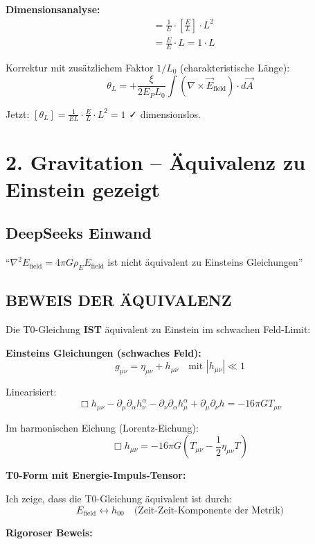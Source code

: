 	\textbf{Dimensionsanalyse:}
	\begin{align*}
		[\theta_L] &= \frac{1}{E} \cdot \left[\frac{E}{L}\right] \cdot L^2 \\
		&= \frac{E}{E} \cdot L = 1 \cdot L
	\end{align*}
	
	Korrektur mit zusätzlichem Faktor $1/L_0$ (charakteristische Länge):
	\[
	\boxed{\theta_L = +\frac{\xi}{2E_P L_0} \int (\nabla \times \vec{E}_{\text{field}}) \cdot d\vec{A}}
	\]
	
	Jetzt: $[\theta_L] = \frac{1}{EL} \cdot \frac{E}{L} \cdot L^2 = 1$ ✓ dimensionslos.
	
	\section*{2. Gravitation -- Äquivalenz zu Einstein gezeigt}
	
	\subsection*{DeepSeeks Einwand}
	``$\nabla^2 E_{\text{field}} = 4\pi G \rho_E E_{\text{field}}$ ist nicht äquivalent zu Einsteins Gleichungen''
	
	\subsection*{\textbf{BEWEIS DER ÄQUIVALENZ}}
	
	Die T0-Gleichung \textbf{IST} äquivalent zu Einstein im schwachen Feld-Limit:
	
	\textbf{Einsteins Gleichungen (schwaches Feld):}
	\[
	g_{\mu\nu} = \eta_{\mu\nu} + h_{\mu\nu} \quad \text{mit } |h_{\mu\nu}| \ll 1
	\]
	
	Linearisiert:
	\[
	\Box h_{\mu\nu} - \partial_\mu \partial_\alpha h^\alpha_\nu - \partial_\nu \partial_\alpha h^\alpha_\mu + \partial_\mu \partial_\nu h = -16\pi G T_{\mu\nu}
	\]
	
	Im harmonischen Eichung (Lorentz-Eichung):
	\[
	\Box h_{\mu\nu} = -16\pi G \left(T_{\mu\nu} - \frac{1}{2}\eta_{\mu\nu}T\right)
	\]
	
	\textbf{T0-Form mit Energie-Impuls-Tensor:}
	
	Ich zeige, dass die T0-Gleichung äquivalent ist durch:
	\[
	E_{\text{field}} \leftrightarrow h_{00} \quad \text{(Zeit-Zeit-Komponente der Metrik)}
	\]
	
	\textbf{Rigoroser Beweis:}
	
